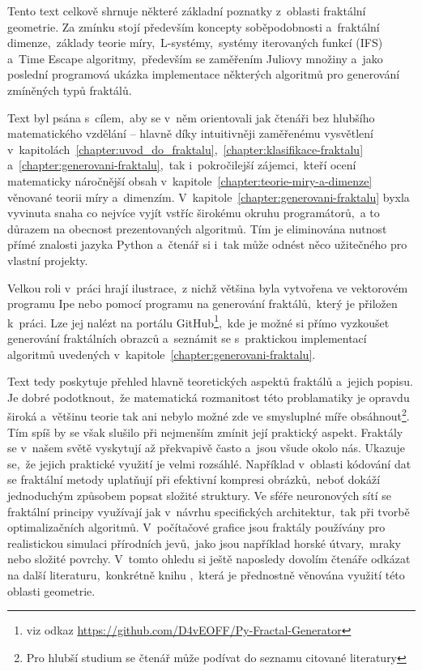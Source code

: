 
Tento text celkově shrnuje některé základní poznatky z~oblasti fraktální geometrie. Za zmínku stojí především koncepty soběpodobnosti a~fraktální dimenze,~základy teorie míry,~L-systémy,~systémy iterovaných funkcí (IFS) a~Time Escape algoritmy,~především se zaměřením Juliovy množiny a~jako poslední programová ukázka implementace některých algoritmů pro generování zmíněných typů fraktálů.

Text byl psána s~cílem,~aby se v~něm orientovali jak čtenáři bez hlubšího matematického vzdělání -- hlavně díky intuitivněji zaměřenému vysvětlení v~kapitolách~\ref{chapter:uvod_do_fraktalu},~\ref{chapter:klasifikace-fraktalu} a~\ref{chapter:generovani-fraktalu},~tak i~pokročilejší zájemci,~kteří ocení matematicky náročnější obsah v~kapitole~\ref{chapter:teorie-miry-a-dimenze} věnované teorii míry a~dimenzím. V~kapitole~\ref{chapter:generovani-fraktalu} byxla vyvinuta snaha co nejvíce vyjít vstříc širokému okruhu programátorů,~a to důrazem na obecnost prezentovaných algoritmů. Tím je eliminována nutnost přímé znalosti jazyka Python a~čtenář si i~tak může odnést něco užitečného pro vlastní projekty.

Velkou roli v~práci hrají ilustrace,~z nichž většina byla vytvořena ve vektorovém programu Ipe nebo pomocí programu na generování fraktálů,~který je přiložen k~práci. Lze jej nalézt na portálu GitHub\footnote{viz odkaz \url{https://github.com/D4vEOFF/Py-Fractal-Generator}},~kde je možné si přímo vyzkoušet generování fraktálních obrazců a~seznámit se s~praktickou implementací algoritmů uvedených v~kapitole~\ref{chapter:generovani-fraktalu}.

Text tedy poskytuje přehled hlavně teoretických aspektů fraktálů a~jejich popisu. Je dobré podotknout,~že matematická rozmanitost této problamatiky je opravdu široká a~většinu teorie tak ani nebylo možné zde ve smysluplné míře obsáhnout\footnote{Pro hlubší studium se čtenář může podívat do seznamu citované literatury}. Tím spíš by se však slušilo při nejmenším zmínit její praktický aspekt. Fraktály se v~našem světě vyskytují až překvapivě často a~jsou všude okolo nás. Ukazuje se,~že jejich praktické využití je velmi rozsáhlé. Například v~oblasti kódování dat se fraktální metody uplatňují při efektivní kompresi obrázků,~neboť dokáží jednoduchým způsobem popsat složité struktury. Ve sféře neuronových sítí se fraktální principy využívají jak v~návrhu specifických architektur,~tak při tvorbě optimalizačních algoritmů. V~počítačové grafice jsou fraktály používány pro realistickou simulaci přírodních jevů,~jako jsou například horské útvary,~mraky nebo složité povrchy. V~tomto ohledu si ještě naposledy dovolím čtenáře odkázat na další literaturu,~konkrétně knihu \cite{Zelinka2006},~která je přednostně věnována využití této oblasti geometrie.

